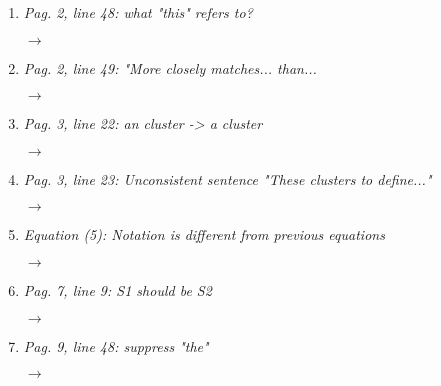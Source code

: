 \documentclass[10pt]{article}
\begin{document}
\begin{enumerate}
\item \emph{Pag. 2, line 48: what "this" refers to?}

$\rightarrow$

\item \emph{Pag. 2, line 49: "More closely matches... than...}

$\rightarrow$

\item \emph{Pag. 3, line 22: an cluster -> a cluster}

$\rightarrow$

\item \emph{Pag. 3, line 23: Unconsistent sentence "These clusters to define..."}

$\rightarrow$

\item \emph{Equation (5): Notation is different from previous equations}

$\rightarrow$

\item \emph{Pag. 7, line 9: S1 should be S2}

$\rightarrow$

\item \emph{Pag. 9, line 48: suppress "the"}

$\rightarrow$

\end{enumerate}
\end{document}

